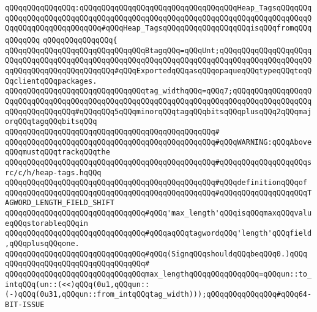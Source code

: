 \verb|qQQqqQQqqQQqqQQq:qQQqqQQqqQQqqQQqqQQqqQQqqQQqqQQqqQQqHeap_TagsqQQqqQQqqQQqqQQqqQQqqQQqqQQqqQQqqQQqqQQqqQQqqQQqqQQqqQQqqQQqqQQqqQQqqQQqqQQqqQQqqQQqqQQqqQQqqQQqqQQq#qQQqHeap_TagsqQQqqQQqqQQqqQQqqQQqisqQQqfromqQQqqQQqqQQq|\newline
\verb|qQQqqQQqqQQqqQQq{|\newline
\verb|qQQqqQQqqQQqqQQqqQQqqQQqqQQqqQQqBtagqQQq=qQQqUnt;qQQqqQQqqQQqqQQqqQQqqQQqqQQqqQQqqQQqqQQqqQQqqQQqqQQqqQQqqQQqqQQqqQQqqQQqqQQqqQQqqQQqqQQqqQQqqQQqqQQqqQQqqQQqqQQqqQQq#qQQqExportedqQQqasqQQqopaqueqQQqtypeqQQqtoqQQqclientqQQqpackages.|\newline
\newline
\newline
\verb|qQQqqQQqqQQqqQQqqQQqqQQqqQQqqQQqtag_widthqQQq=qQQq7;qQQqqQQqqQQqqQQqqQQqqQQqqQQqqQQqqQQqqQQqqQQqqQQqqQQqqQQqqQQqqQQqqQQqqQQqqQQqqQQqqQQqqQQqqQQqqQQqqQQqqQQq#qQQqqQQq5qQQqminorqQQqtagqQQqbitsqQQqplusqQQq2qQQqmajorqQQqtagqQQqbitsqQQq|\newline
\verb|qQQqqQQqqQQqqQQqqQQqqQQqqQQqqQQqqQQqqQQqqQQqqQQq#|\newline
\verb|qQQqqQQqqQQqqQQqqQQqqQQqqQQqqQQqqQQqqQQqqQQqqQQq#qQQqWARNING:qQQqAboveqQQqmustqQQqtrackqQQqthe|\newline
\verb|qQQqqQQqqQQqqQQqqQQqqQQqqQQqqQQqqQQqqQQqqQQqqQQq#qQQqqQQqqQQqqQQqqQQqsrc/c/h/heap-tags.hqQQq|\newline
\verb|qQQqqQQqqQQqqQQqqQQqqQQqqQQqqQQqqQQqqQQqqQQqqQQq#qQQqdefinitionqQQqof|\newline
\verb|qQQqqQQqqQQqqQQqqQQqqQQqqQQqqQQqqQQqqQQqqQQqqQQq#qQQqqQQqqQQqqQQqqQQqTAGWORD_LENGTH_FIELD_SHIFT|\newline
\newline
\newline
\verb|qQQqqQQqqQQqqQQqqQQqqQQqqQQqqQQq#qQQq'max_length'qQQqisqQQqmaxqQQqvalueqQQqstorableqQQqin|\newline
\verb|qQQqqQQqqQQqqQQqqQQqqQQqqQQqqQQq#qQQqaqQQqtagwordqQQq'length'qQQqfield,qQQqplusqQQqone.|\newline
\verb|qQQqqQQqqQQqqQQqqQQqqQQqqQQqqQQq#qQQq(SignqQQqshouldqQQqbeqQQq0.)qQQq|\newline
\verb|qQQqqQQqqQQqqQQqqQQqqQQqqQQqqQQq#|\newline
\verb|qQQqqQQqqQQqqQQqqQQqqQQqqQQqqQQqmax_lengthqQQqqQQqqQQqqQQq=qQQqun::to_intqQQq(un::(<<)qQQq(0u1,qQQqun::(-)qQQq(0u31,qQQqun::from_intqQQqtag_width)));qQQqqQQqqQQqqQQq#qQQq64-BIT-ISSUE|\newline
